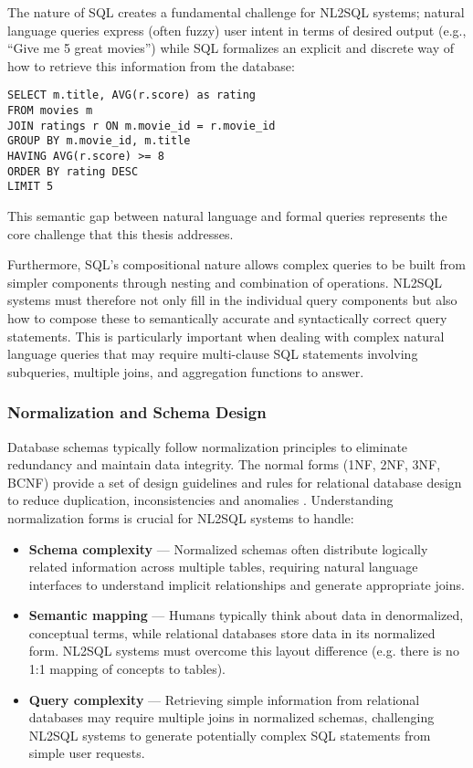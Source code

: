 \documentclass{article}
\begin{document}
The nature of SQL creates a fundamental challenge for NL2SQL systems; natural language queries express (often fuzzy) user
intent in terms of desired output (e.g., ``Give me 5 great movies'') while SQL formalizes an explicit and discrete way
of how to retrieve this information from the database:

\begin{verbatim}
SELECT m.title, AVG(r.score) as rating
FROM movies m
JOIN ratings r ON m.movie_id = r.movie_id
GROUP BY m.movie_id, m.title
HAVING AVG(r.score) >= 8
ORDER BY rating DESC
LIMIT 5
\end{verbatim}

This semantic gap between natural language and formal queries represents the core challenge that this thesis addresses.

Furthermore, SQL's compositional nature allows complex queries to be built from simpler components through nesting and
combination of operations. NL2SQL systems must therefore not only fill in the individual query components but also how
to compose these to semantically accurate and syntactically correct query statements. This is particularly important when
dealing with complex natural language queries that may require multi-clause SQL statements involving subqueries, multiple
joins, and aggregation functions to answer.

\subsubsection{Normalization and Schema Design}

Database schemas typically follow normalization principles to eliminate redundancy and maintain data integrity. The normal forms
(1NF, 2NF, 3NF, BCNF) provide a set of design guidelines and rules for relational database design to reduce duplication,
inconsistencies and anomalies \citep{DatabaseSystemIntro}. Understanding normalization forms is crucial for NL2SQL systems to handle:

\begin{itemize}
    \item \textbf{Schema complexity} — Normalized schemas often distribute logically related information across multiple tables,
          requiring natural language interfaces to understand implicit relationships and generate appropriate joins.
    \item \textbf{Semantic mapping} — Humans typically think about data in denormalized, conceptual terms, while relational databases
          store data in its normalized form. NL2SQL systems must overcome this layout difference (e.g. there is no 1:1 mapping
          of concepts to tables).
    \item \textbf{Query complexity} — Retrieving simple information from relational databases may require multiple joins in normalized schemas,
          challenging NL2SQL systems to generate potentially complex SQL statements from simple user requests.
\end{itemize}
\end{document}
